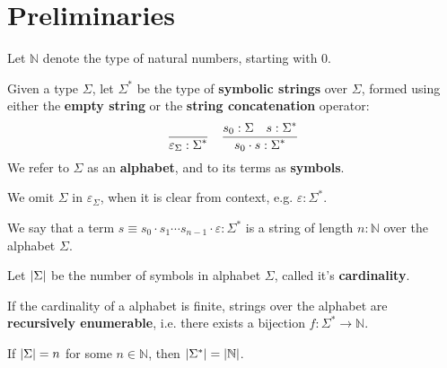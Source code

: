
\section{Preliminaries}

\begin{definition} Let $\mathbb{N}$ denote the type of natural numbers,
starting with $0$.\end{definition}

\begin{definition} Given a type $\Sigma$, let $\Sigma^*$ be the type of
\textbf{symbolic strings} over $\Sigma$, formed using either the \textbf{empty
string} or the \textbf{string concatenation} operator:
\begin{align*}\label{def:empty-string}
\judgement{}{\varepsilon_\Sigma:\Sigma^*}
\quad
\judgement{s_0:\Sigma \quad s:\Sigma^*}{s_0 \cdot s:\Sigma^*}
\end{align*}
We refer to $\Sigma$ as an \textbf{alphabet}, and to its
terms as \textbf{symbols}.
\end{definition}

We omit $\Sigma$ in $\varepsilon_\Sigma$, when it is clear from context, e.g.
$\varepsilon:\Sigma^*$.

\begin{definition} We say that a term $s\equiv s_0 \cdot s_1 \cdots s_{n-1}
\cdot \varepsilon : \Sigma^*$  is a string of length $n:\mathbb{N}$ over the
alphabet $\Sigma$.\end{definition}

\begin{definition} Let $\left|{\Sigma}\right|$ be the number of symbols in alphabet
$\Sigma$, called it's \textbf{cardinality}. \end{definition}

If the cardinality of a alphabet is finite, strings over the alphabet are
\textbf{recursively enumerable}, i.e. there exists a bijection
$f:\Sigma^*\rightarrow\mathbb{N}$.

\begin{theorem} If $\left|{\Sigma}\right| = n$ for some $n\in\mathbb{N}$, then
$\left|{\Sigma^*}\right|=\left|{\mathbb{N}}\right|$.\end{theorem}

